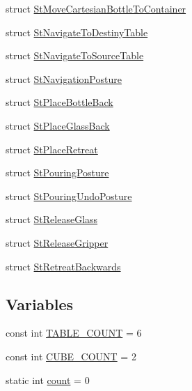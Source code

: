 \begin{DoxyCompactItemize}
struct \hyperlink{structsm__fetch__two__table__whiskey__pour_1_1StMoveCartesianBottleToContainer}{St\+Move\+Cartesian\+Bottle\+To\+Container}
\item 
struct \hyperlink{structsm__fetch__two__table__whiskey__pour_1_1StNavigateToDestinyTable}{St\+Navigate\+To\+Destiny\+Table}
\item 
struct \hyperlink{structsm__fetch__two__table__whiskey__pour_1_1StNavigateToSourceTable}{St\+Navigate\+To\+Source\+Table}
\item 
struct \hyperlink{structsm__fetch__two__table__whiskey__pour_1_1StNavigationPosture}{St\+Navigation\+Posture}
\item 
struct \hyperlink{structsm__fetch__two__table__whiskey__pour_1_1StPlaceBottleBack}{St\+Place\+Bottle\+Back}
\item 
struct \hyperlink{structsm__fetch__two__table__whiskey__pour_1_1StPlaceGlassBack}{St\+Place\+Glass\+Back}
\item 
struct \hyperlink{structsm__fetch__two__table__whiskey__pour_1_1StPlaceRetreat}{St\+Place\+Retreat}
\item 
struct \hyperlink{structsm__fetch__two__table__whiskey__pour_1_1StPouringPosture}{St\+Pouring\+Posture}
\item 
struct \hyperlink{structsm__fetch__two__table__whiskey__pour_1_1StPouringUndoPosture}{St\+Pouring\+Undo\+Posture}
\item 
struct \hyperlink{structsm__fetch__two__table__whiskey__pour_1_1StReleaseGlass}{St\+Release\+Glass}
\item 
struct \hyperlink{structsm__fetch__two__table__whiskey__pour_1_1StReleaseGripper}{St\+Release\+Gripper}
\item 
struct \hyperlink{structsm__fetch__two__table__whiskey__pour_1_1StRetreatBackwards}{St\+Retreat\+Backwards}
\end{DoxyCompactItemize}
\subsection*{Variables}
\begin{DoxyCompactItemize}
\item 
const int \hyperlink{namespacesm__fetch__two__table__whiskey__pour_a17b0c4eed9dc45b1cdf81aeb8cab3fda}{T\+A\+B\+L\+E\+\_\+\+C\+O\+U\+NT} = 6
\item 
const int \hyperlink{namespacesm__fetch__two__table__whiskey__pour_ab6321f5657e6b4b621a9b084f81bdeb6}{C\+U\+B\+E\+\_\+\+C\+O\+U\+NT} = 2
\item 
static int \hyperlink{namespacesm__fetch__two__table__whiskey__pour_acbce06cd0c9048e8be6a258e2c406986}{count} = 0
\end{DoxyCompactItemize}


